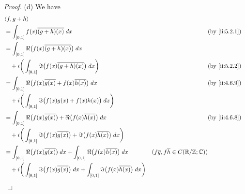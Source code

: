 \begin{proof}{(d)}
  We have
  \begin{align*}
     & \inner*{f, g + h}                                                                                                                                                                                          \\
     & = \int_{[0, 1]} f(x) \overline{(g + h)(x)} \; dx                                                                                    &                                                      & \by{ii:5.2.1} \\
     & = \int_{[0, 1]} \Re\big(f(x) \overline{(g + h)(x)}\big) \; dx                                                                                                                                              \\
     & \quad + i \bigg(\int_{[0, 1]} \Im\big(f(x) \overline{(g + h)(x)}\big) \; dx\bigg)                                                   &                                                      & \by{ii:5.2.2} \\
     & = \int_{[0, 1]} \Re\big(f(x) \overline{g(x)} + f(x) \overline{h(x)}\big) \; dx                                                      &                                                      & \by{ii:4.6.9} \\
     & \quad + i \bigg(\int_{[0, 1]} \Im\big(f(x) \overline{g(x)} + f(x) \overline{h(x)}\big) \; dx\bigg)                                                                                                         \\
     & = \int_{[0, 1]} \Re\big(f(x) \overline{g(x)}) + \Re\big(f(x) \overline{h(x)}\big) \; dx                                             &                                                      & \by{ii:4.6.8} \\
     & \quad + i \bigg(\int_{[0, 1]} \Im\big(f(x) \overline{g(x)}\big) + \Im\big(f(x) \overline{h(x)}\big) \; dx\bigg)                                                                                            \\
     & = \int_{[0, 1]} \Re\big(f(x) \overline{g(x)}) \; dx + \int_{[0, 1]} \Re\big(f(x) \overline{h(x)}\big) \; dx                         & (f \overline{g}, f \overline{h} \in C(\R / \Z ; \C))                 \\
     & \quad + i \bigg(\int_{[0, 1]} \Im\big(f(x) \overline{g(x)}\big) \; dx + \int_{[0, 1]} \Im\big(f(x) \overline{h(x)}\big) \; dx\bigg)                                                                        \\

\end{align*}
\end{proof}
